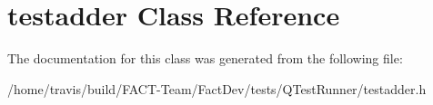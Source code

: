 \hypertarget{classtestadder}{\section{testadder Class Reference}
\label{classtestadder}
}


The documentation for this class was generated from the following file\-:\begin{DoxyCompactItemize}
\item 
/home/travis/build/\-F\-A\-C\-T-\/\-Team/\-Fact\-Dev/tests/\-Q\-Test\-Runner/testadder.\-h\end{DoxyCompactItemize}
